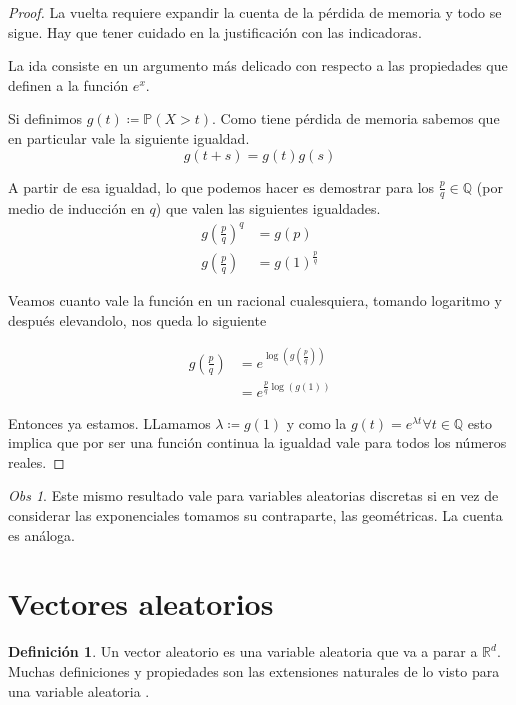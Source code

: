 \documentclass[11pt]{article}
\theoremstyle{plain} %
\theoremstyle{definition}
\newtheorem*{definicion}{Definici\'{o}n} %
\theoremstyle{remark}
\newtheorem{obs}{Obs}
\def\Q{\mathbb{Q}}
\def\R{\mathbb{R}}
\def\P{\mathbb{P}}
\def\va{variable aleatoria }
\def\vas{variables aleatorias }
\def\blue{\textcolor{blue!60!black}}
\begin{document}
\begin{proof}
	
	La vuelta requiere expandir la cuenta de la p\'erdida de memoria y todo se sigue. Hay que tener cuidado en la justificaci\'on con las indicadoras.
	
	La ida consiste en un argumento m\'as delicado con respecto a las propiedades que definen a la funci\'on $e^x$. 
	
	Si definimos $g(t) \coloneqq \P(X>t) $. Como tiene p\'erdida de memoria sabemos que en particular vale la siguiente igualdad.
	\[g(t+s) = g(t)g(s)\]
	
	A partir de esa igualdad, lo que podemos hacer es demostrar para los $\frac{p}{q} \in \Q$ (por medio de inducci\'on en $q$) que valen las siguientes igualdades.
	\begin{align*}
		g\left( \frac{p}{q}\right) ^q &= g\left( p\right)  \\
		g\left( \frac{p}{q}\right)  &= g\left( 1\right) ^{\frac{p}{q}}
	\end{align*} 
	
	Veamos cuanto vale la funci\'on en un racional cualesquiera, tomando logaritmo y despu\'es elevandolo, nos queda lo siguiente
	
	\begin{align*}
		g\left( \frac{p}{q}\right)  &= e^{\log\left( g\left( \frac{p}{q}\right) \right) } \\
		&= e^{\frac{p}{q} \log\left( g\left( 1\right) \right) } 
	\end{align*}
	
	Entonces ya estamos. LLamamos $\lambda \coloneqq g(1)$ y como la $g(t) = e^{\lambda t} \forall t \in \Q$ esto implica que por ser una funci\'on continua la igualdad vale para todos los n\'umeros reales.
	
	
\end{proof}

\begin{obs}
	Este mismo resultado vale para \vas discretas si en vez de considerar las exponenciales tomamos su contraparte, las geom\'etricas. La cuenta es an\'aloga.
\end{obs}



\bigskip

\section{Vectores aleatorios}

\begin{definicion}
	Un \blue{vector aleatorio} es una \va que va a parar a $\R^d$. Muchas definiciones y propiedades son las extensiones naturales de lo visto para una \va.
\end{definicion}
\end{document}
